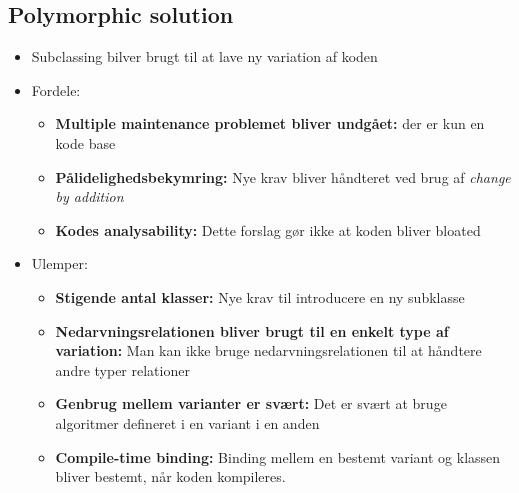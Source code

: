 \documentclass[a4, english]{article}
\begin{document}
\subsection{Polymorphic solution}
\begin{itemize}
	\item Subclassing bilver brugt til at lave ny variation af koden
  \item Fordele:
  \begin{itemize}
  	\item \textbf{Multiple maintenance problemet bliver undgået:} der er kun en kode base
    \item \textbf{Pålidelighedsbekymring:} Nye krav bliver håndteret ved brug af \textit{change by addition}
    \item \textbf{Kodes analysability:} Dette forslag gør ikke at koden bliver bloated
  \end{itemize}
  \item Ulemper: 
  \begin{itemize}
  	\item \textbf{Stigende antal klasser:} Nye krav til introducere en ny subklasse
    \item \textbf{Nedarvningsrelationen bliver brugt til en enkelt type af variation:} Man kan ikke bruge nedarvningsrelationen til at håndtere andre typer relationer
    \item \textbf{Genbrug mellem varianter er svært:} Det er svært at bruge algoritmer defineret i en variant i en anden
    \item \textbf{Compile-time binding:} Binding mellem en bestemt variant og klassen bliver bestemt, når koden kompileres.
  \end{itemize}
\end{itemize}
\end{document}
